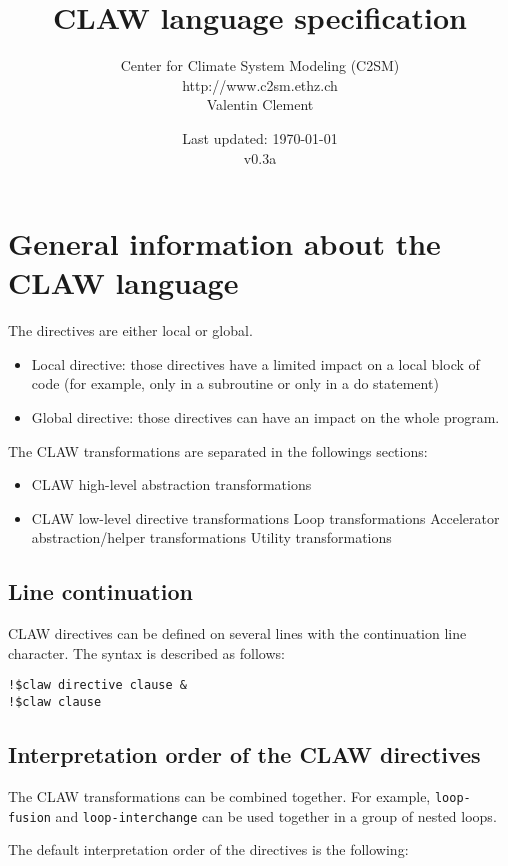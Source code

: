 \documentclass{article}
\title{CLAW language specification}
\author{Center for Climate System Modeling (C2SM)\\http://www.c2sm.ethz.ch\\Valentin Clement}
\date{Last updated: \today \\\vspace{1em}v0.3a}
\begin{document}
\maketitle


\tableofcontents

\section{General information about the CLAW language}
The directives are either local or global.

\begin{itemize}
\item Local directive: those directives have a limited impact on a local block of
code (for example, only in a subroutine or only in a do statement)
\item Global directive: those directives can have an impact on the whole
program.
\end{itemize}

The CLAW transformations are separated in the followings sections:
\begin{itemize}
\item CLAW high-level abstraction transformations
\item CLAW low-level directive transformations
\subitem Loop transformations
\subitem Accelerator abstraction/helper transformations
\subitem Utility transformations
\end{itemize}

\subsection{Line continuation}
CLAW directives can be defined on several lines with the continuation line character. The syntax is described as follows:

\begin{lstlisting}
!$claw directive clause &
!$claw clause
\end{lstlisting}


\subsection{Interpretation order of the CLAW directives}
The CLAW transformations can be combined together. For example, \lstinline!loop-fusion! and \lstinline!loop-interchange! can be used together in a group of nested loops.

The default interpretation order of the directives is the following:
\end{document}
